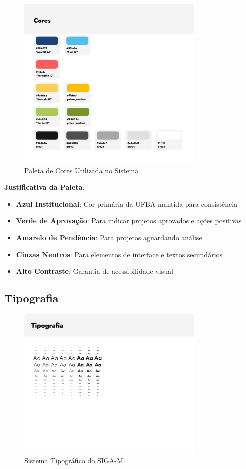 \documentclass[12pt, a4paper]{report}
\begin{document}
\begin{figure}[H]
\centering
\includegraphics[width=0.8\textwidth]{figma/Cores.png}
\caption{Paleta de Cores Utilizada no Sistema}
\label{fig:cores}
\end{figure}

\textbf{Justificativa da Paleta}:
\begin{itemize}
    \item \textbf{Azul Institucional}: Cor primária da UFBA mantida para consistência
    \item \textbf{Verde de Aprovação}: Para indicar projetos aprovados e ações positivas
    \item \textbf{Amarelo de Pendência}: Para projetos aguardando análise
    \item \textbf{Cinzas Neutros}: Para elementos de interface e textos secundários
    \item \textbf{Alto Contraste}: Garantia de acessibilidade visual
\end{itemize}

\subsection{Tipografia}

\begin{figure}[H]
\centering
\includegraphics[width=0.8\textwidth]{figma/Tipografia.png}
\caption{Sistema Tipográfico do SIGA-M}
\label{fig:tipografia}
\end{figure}
\end{document}
